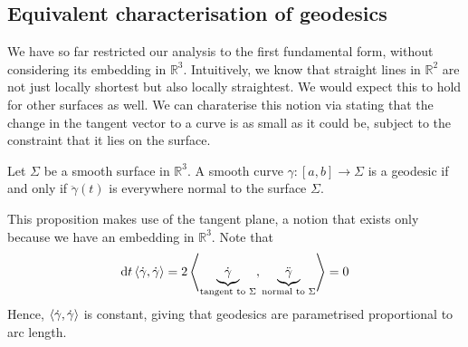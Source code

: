 \subsection{Equivalent characterisation of geodesics}
We have so far restricted our analysis to the first fundamental form, without considering its embedding in \( \mathbb R^3 \).
Intuitively, we know that straight lines in \( \mathbb R^2 \) are not just locally shortest but also locally straightest.
We would expect this to hold for other surfaces as well.
We can charaterise this notion via stating that the change in the tangent vector to a curve is as small as it could be, subject to the constraint that it lies on the surface.

\begin{proposition}
	Let \( \Sigma \) be a smooth surface in \( \mathbb R^3 \).
	A smooth curve \( \gamma \colon [a,b] \to \Sigma \) is a geodesic if and only if \( \ddot \gamma(t) \) is everywhere normal to the surface \( \Sigma \).
\end{proposition}
\begin{remark}
	This proposition makes use of the tangent plane, a notion that exists only because we have an embedding in \( \mathbb R^3 \).
	Note that
	\[ \dd{t} \left\langle{\dot \gamma, \dot \gamma}\right\rangle = 2 \left\langle{\underbrace{\dot \gamma}_{\text{tangent to } \Sigma}, \underbrace{\ddot \gamma}_{\text{normal to } \Sigma}}\right\rangle = 0 \]
	Hence, \( \left\langle{\dot \gamma, \dot \gamma}\right\rangle \) is constant, giving that geodesics are parametrised proportional to arc length.
\end{remark}
